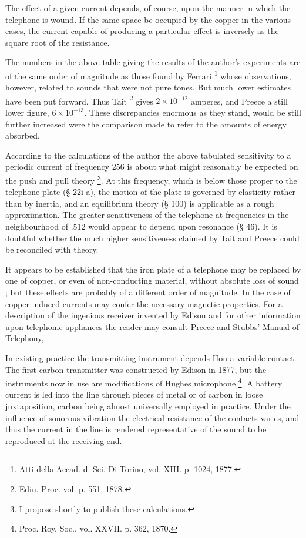The effect of a given current depends, of course, upon the
manner in which the telephone is wound. If the same space be
occupied by the copper in the various cases, the current capable of
producing a particular effect is inversely as the square root of the
resistance.

The numbers in the above table giving the results of the
author’s experiments are of the same order of magnitude as
those found by Ferrari
\footnote{Atti della Accad. d. Sci. Di Torino, vol. XIII. p. 1024, 1877.}
whose observations, however, related
to sounds that were not pure tones. But much lower estimates
have been put forward. Thus Tait
\footnote{Edin. Proc. vol.  p. 551, 1878.}
gives \(2 \times 10^{-12}\)  amperes,
and Preece a still lower figure,
\(6 \times 10^{-13}\).  These discrepancies
enormous as they stand, would be still further increased were
the comparison made to refer to the amounts of energy absorbed.

According to the calculations of the author the above tabulated
sensitivity to a periodic current of frequency 256 is about what
might reasonably be expected on the push and pull theory
\footnote{I propose shortly to publish these calculations.}.
At this frequency, which is below those proper to the telephone plate
(§ 22i a), the motion of the plate is governed by elasticity rather
than by inertia, and an equilibrium theory (§ 100) is applicable as
a rough approximation. The greater sensitiveness of the telephone
at frequencies in the neighbourhood of .512 would appear to
depend upon resonance (§ 46). It is doubtful whether the much
higher sensitiveness claimed by Tait and Preece could be reconciled with theory.

It appears to be established that the iron plate of a telephone
may be replaced by one of copper, or even of non-conducting
material, without absolute loss of sound ; but these effects are
probably of a different order of magnitude. In the case of copper
induced currents may confer the necessary magnetic properties.
For a description of the ingenious receiver invented by Edison
and for other information upon telephonic appliances the reader
may consult Preece and Stubbs’ Manual of Telephony,

In existing practice the transmitting instrument depends
 Hon a variable contact. The first carbon transmitter was constructed by Edison
in 1877, but the instruments now in use are
modifications of Hughes microphone
\footnote{Proc. Roy, Soc., vol. XXVII. p. 362, 1870.}.
A battery current is led
into the line through pieces of metal or of carbon in loose juxtaposition,
carbon being almost universally employed in practice.
Under the influence of sonorous vibration the electrical resistance
of the contacts varies, and thus the current in the line is rendered
representative of the sound to be reproduced at the receiving end.

